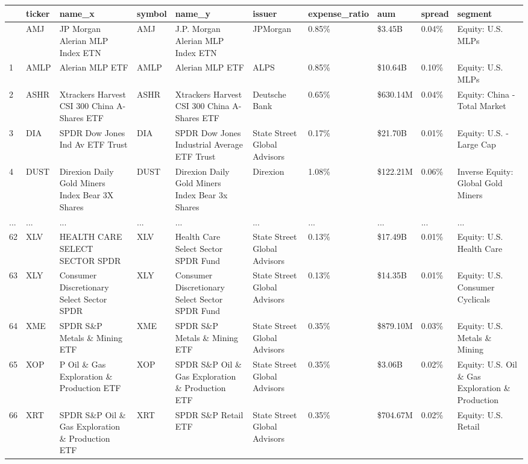 \documentclass[
  letterpaper,
  DIV=11,
  numbers=noendperiod]{scrreprt}
\begin{document}
\begin{longtable}[]{@{}llllllllll@{}}
\toprule\noalign{}
& ticker & name\_x & symbol & name\_y & issuer & expense\_ratio & aum &
spread & segment \\
\midrule\noalign{}
\endhead
\bottomrule\noalign{}
\endlastfoot
0 & AMJ & JP Morgan Alerian MLP Index ETN & AMJ & J.P. Morgan Alerian
MLP Index ETN & JPMorgan & 0.85\% & \$3.45B & 0.04\% & Equity: U.S.
MLPs \\
1 & AMLP & Alerian MLP ETF & AMLP & Alerian MLP ETF & ALPS & 0.85\% &
\$10.64B & 0.10\% & Equity: U.S. MLPs \\
2 & ASHR & Xtrackers Harvest CSI 300 China A-Shares ETF & ASHR &
Xtrackers Harvest CSI 300 China A-Shares ETF & Deutsche Bank & 0.65\% &
\$630.14M & 0.04\% & Equity: China - Total Market \\
3 & DIA & SPDR Dow Jones Ind Av ETF Trust & DIA & SPDR Dow Jones
Industrial Average ETF Trust & State Street Global Advisors & 0.17\% &
\$21.70B & 0.01\% & Equity: U.S. - Large Cap \\
4 & DUST & Direxion Daily Gold Miners Index Bear 3X Shares & DUST &
Direxion Daily Gold Miners Index Bear 3x Shares & Direxion & 1.08\% &
\$122.21M & 0.06\% & Inverse Equity: Global Gold Miners \\
... & ... & ... & ... & ... & ... & ... & ... & ... & ... \\
62 & XLV & HEALTH CARE SELECT SECTOR SPDR & XLV & Health Care Select
Sector SPDR Fund & State Street Global Advisors & 0.13\% & \$17.49B &
0.01\% & Equity: U.S. Health Care \\
63 & XLY & Consumer Discretionary Select Sector SPDR & XLY & Consumer
Discretionary Select Sector SPDR Fund & State Street Global Advisors &
0.13\% & \$14.35B & 0.01\% & Equity: U.S. Consumer Cyclicals \\
64 & XME & SPDR S\&P Metals \& Mining ETF & XME & SPDR S\&P Metals \&
Mining ETF & State Street Global Advisors & 0.35\% & \$879.10M & 0.03\%
& Equity: U.S. Metals \& Mining \\
65 & XOP & P Oil \& Gas Exploration \& Production ETF & XOP & SPDR S\&P
Oil \& Gas Exploration \& Production ETF & State Street Global Advisors
& 0.35\% & \$3.06B & 0.02\% & Equity: U.S. Oil \& Gas Exploration \&
Production \\
66 & XRT & SPDR S\&P Oil \& Gas Exploration \& Production ETF & XRT &
SPDR S\&P Retail ETF & State Street Global Advisors & 0.35\% & \$704.67M
& 0.02\% & Equity: U.S. Retail \\
\end{longtable}
\end{document}
